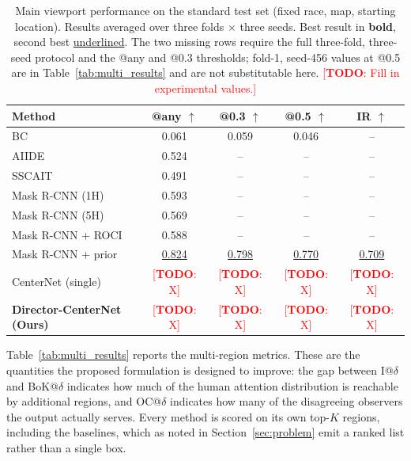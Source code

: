 \documentclass[preprint,12pt]{elsarticle}
\newcommand{\todo}[1]{\textcolor{red}{[\textbf{TODO}: #1]}}
\begin{document}
\begin{table}[t]
  \centering
  \caption{Main viewport performance on the standard test set (fixed race, 
  map, starting location). Results averaged over three folds $\times$ three 
  seeds. Best result in \textbf{bold}, second best \underline{underlined}.
  The two missing rows require the full three-fold, three-seed protocol and
  the @any and @0.3 thresholds; fold-1, seed-456 values at @0.5 are in
  Table~\ref{tab:multi_results} and are not substitutable here.
  \todo{Fill in experimental values.}}
  \label{tab:main_results}
  \begin{tabular}{lcccc}
    \toprule
    Method & @any $\uparrow$ & @0.3 $\uparrow$ & @0.5 $\uparrow$ 
           & IR $\uparrow$ \\
    \midrule
    BC                         & 0.061 & 0.059 & 0.046 & -- \\
    AIIDE                      & 0.524 & --    & --    & -- \\
    SSCAIT                     & 0.491 & --    & --    & -- \\
    Mask R-CNN (1H)            & 0.593 & --    & --    & -- \\
    Mask R-CNN (5H)            & 0.569 & --    & --    & -- \\
    Mask R-CNN + ROCI          & 0.588 & --    & --    & -- \\
    Mask R-CNN + prior         & \underline{0.824} & \underline{0.798}
                               & \underline{0.770} & \underline{0.709} \\
    CenterNet (single)         & \todo{X} & \todo{X} & \todo{X} & \todo{X} \\
    \midrule
    \textbf{Director-CenterNet (Ours)} & \todo{X} & \todo{X} 
                               & \todo{X} & \todo{X} \\
    \bottomrule
  \end{tabular}
\end{table}

Table~\ref{tab:multi_results} reports the multi-region metrics. These are the
quantities the proposed formulation is designed to improve: the gap between
I@$\delta$ and BoK@$\delta$ indicates how much of the human attention
distribution is reachable by additional regions, and OC@$\delta$ indicates how
many of the disagreeing observers the output actually serves. Every method is
scored on its own top-$K$ regions, including the baselines, which as noted in
Section~\ref{sec:problem} emit a ranked list rather than a single box.
\end{document}
